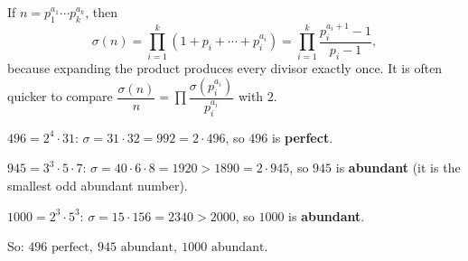 If $n=p_1^{a_1}\cdots p_k^{a_k}$, then
\[
\sigma(n)=\prod_{i=1}^{k}\left(1+p_i+\cdots+p_i^{a_i}\right)=\prod_{i=1}^{k}\dfrac{p_i^{a_i+1}-1}{p_i-1},
\]
because expanding the product produces every divisor exactly once. It is often quicker to compare $\dfrac{\sigma(n)}{n}=\prod\dfrac{\sigma(p_i^{a_i})}{p_i^{a_i}}$ with $2$.

$496=2^4\cdot31$: $\sigma=31\cdot32=992=2\cdot496$, so $496$ is \textbf{perfect}.

$945=3^3\cdot5\cdot7$: $\sigma=40\cdot6\cdot8=1920>1890=2\cdot945$, so $945$ is \textbf{abundant} (it is the smallest odd abundant number).

$1000=2^3\cdot5^3$: $\sigma=15\cdot156=2340>2000$, so $1000$ is \textbf{abundant}.

So: $\boxed{496\text{ perfect},\ 945\text{ abundant},\ 1000\text{ abundant}}$.
